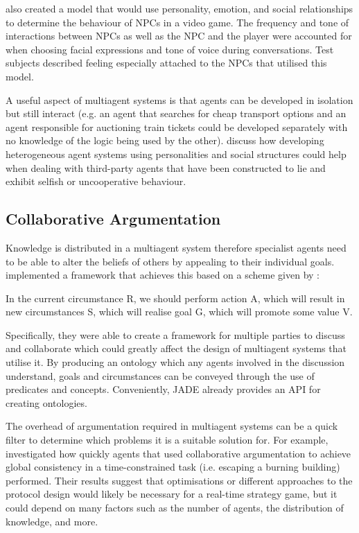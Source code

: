 \documentclass[conference]{IEEEtran}
\begin{document}
\cite{skyrim} also created a model that would use personality, emotion, and social relationships to determine the behaviour of NPCs in a video game. The frequency and tone of interactions between NPCs as well as the NPC and the player were accounted for when choosing facial expressions and tone of voice during conversations. Test subjects described feeling especially attached to the NPCs that utilised this model.

A useful aspect of multiagent systems is that agents can be developed in isolation but still interact (e.g. an agent that searches for cheap transport options and an agent responsible for auctioning train tickets could be developed separately with no knowledge of the logic being used by the other). \cite{hetrogenousagents} discuss how developing heterogeneous agent systems using personalities and social structures could help when dealing with third-party agents that have been constructed to lie and exhibit selfish or uncooperative behaviour.

\subsection{Collaborative Argumentation}

Knowledge is distributed in a multiagent system therefore specialist agents need to be able to alter the beliefs of others by appealing to their individual goals. \cite{argumentation} implemented a framework that achieves this based on a scheme given by \cite{reasoning}:

\begin{displayquote}
	In the current circumstance R, we should perform action A, which will result in new circumstances S, which will realise goal G, which will promote some value V.
\end{displayquote}

Specifically, they were able to create a framework for multiple parties to discuss and collaborate which could greatly affect the design of multiagent systems that utilise it. By producing an ontology which any agents involved in the discussion understand, goals and circumstances can be conveyed through the use of predicates and concepts. Conveniently, JADE already provides an API for creating ontologies.

The overhead of argumentation required in multiagent systems can be a quick filter to determine which problems it is a suitable solution for. For example, \cite{argumentationcontext} investigated how quickly agents that used collaborative argumentation to achieve global consistency in a time-constrained task (i.e. escaping a burning building) performed. Their results suggest that optimisations or different approaches to the protocol design would likely be necessary for a real-time strategy game, but it could depend on many factors such as the number of agents, the distribution of knowledge, and more.
\end{document}
